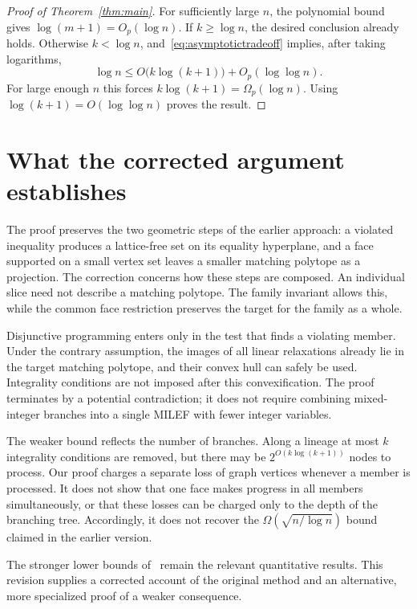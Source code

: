 \documentclass[11pt]{article}
\theoremstyle{definition}
\begin{document}
\begin{proof}[Proof of Theorem~\ref{thm:main}]
For sufficiently large $n$, the polynomial bound gives
$\log(m+1)=O_p(\log n)$. If $k\geq\log n$, the desired conclusion
already holds. Otherwise $k<\log n$, and~\eqref{eq:asymptotictradeoff}
implies, after taking logarithms,
\[
 \log n\leq O\bigl(k\log(k+1)\bigr)+O_p(\log\log n).
\]
For large enough $n$ this forces
$k\log(k+1)=\Omega_p(\log n)$. Using
$\log(k+1)=O(\log\log n)$ proves the result.
\end{proof}

\section{What the corrected argument establishes}\label{sec:scope}

The proof preserves the two geometric steps of the earlier approach: a
violated inequality produces a lattice-free set on its equality hyperplane,
and a face supported on a small vertex set leaves a smaller matching polytope
as a projection. The correction concerns how these steps are composed.
An individual slice need not describe a matching polytope. The family invariant
allows this, while the common face restriction preserves the target for the
family as a whole.

Disjunctive programming enters only in the test that finds a violating
member. Under the contrary assumption, the images of all linear relaxations
already lie in the target matching polytope, and their convex hull can safely
be used. Integrality conditions are not imposed after this convexification.
The proof terminates by a potential contradiction; it does not require
combining mixed-integer branches into a single MILEF with fewer integer
variables.

The weaker bound reflects the number of branches. Along a lineage at most
$k$ integrality conditions are removed, but there may be
$2^{O(k\log(k+1))}$ nodes to process. Our proof charges a separate loss of
graph vertices whenever a member is processed. It does not show that one
face makes progress in all members simultaneously, or that these losses can
be charged only to the depth of the branching tree. Accordingly, it does not
recover the $\Omega(\sqrt{n/\log n})$ bound claimed in the earlier version.

The stronger lower bounds of~\cite{CWZ2018} remain the relevant quantitative
results. This revision supplies a corrected account of the original method
and an alternative, more specialized proof of a weaker consequence.
\end{document}
